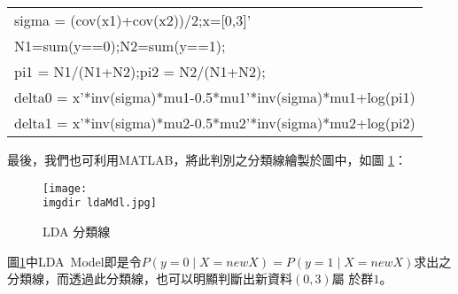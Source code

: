 \begin{enumerate}[Step 1：]
{\begin{center}
{\begin{tabular}{p{}}
							sigma = (cov(x1)+cov(x2))/2;x=[0,3]'\\	
							N1=sum(y==0);N2=sum(y==1);\\							
							pi1 = N1/(N1+N2);pi2 = N2/(N1+N2);\\						
							delta0 = 																					x'*inv(sigma)*mu1-0.5*mu1'*inv(sigma)*mu1+log(pi1)\\
							delta1 = 																					x'*inv(sigma)*mu2-0.5*mu2'*inv(sigma)*mu2+log(pi2)\\
						\end{tabular}
					}
					\end{center}
					\bigskip										
					最後，我們也可利用MATLAB，將此判別之分類線繪製於圖中，如圖										\ref{fig:ldaMdl}：
					\begin{figure}[H]	
		 		 		\centering	 			 	 
   				 		\texttt{[image: \\imgdir ldaMdl.jpg]} 
   			 			\caption{LDA 分類線}   		
   			 			\label{fig:ldaMdl}   			 		 
					\end{figure}
					圖\ref{fig:ldaMdl}中LDA\ Model即是令$P(y=0 \mid X=newX)=P(y=1 							\mid X=newX)$求出之分類線，而透過此分類線，也可以明顯判斷出新資料$(0,3)$屬						於群$1$。
				}
			\end{enumerate} 	
			\bigskip	
